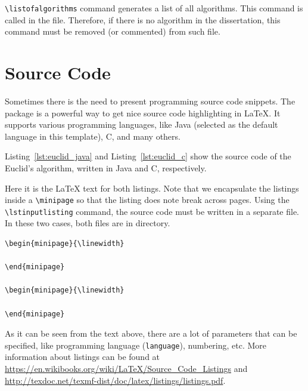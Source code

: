 \texttt{\textbackslash listofalgorithms} command generates a list of all algorithms. This command is called in the  file. Therefore, if there is no algorithm in the dissertation, this command must be removed (or commented) from such file.

\section{Source Code}
Sometimes there is the need to present programming source code snippets.
The  package  is a powerful way to get nice source code highlighting in \LaTeX{}. It supports various programming languages, like Java (selected as the default language in this template), C, and many others.

Listing~\ref{lst:euclid_java} and Listing~\ref{lst:euclid_c} show the source code of the Euclid's algorithm, written in Java and C, respectively.

\begin{minipage}{\linewidth}

\end{minipage}

\begin{minipage}{\linewidth}

\end{minipage}

Here it is the \LaTeX{} text for both listings. Note that we encapsulate the listings inside a \texttt{\textbackslash minipage} so that the listing does note break across pages.
Using the \texttt{\textbackslash lstinputlisting} command, the source code must be written in a separate file. In these two cases, both files are in  directory.

\begin{verbatim}
\begin{minipage}{\linewidth}

\end{minipage}

\begin{minipage}{\linewidth}

\end{minipage}

\end{verbatim}
As it can be seen from the text above, there are a lot of parameters that can be specified, like programming language (\verb|language|), numbering, etc.   
More information about listings can be found at 
\url{https://en.wikibooks.org/wiki/LaTeX/Source_Code_Listings} and 
\url{http://texdoc.net/texmf-dist/doc/latex/listings/listings.pdf}.


